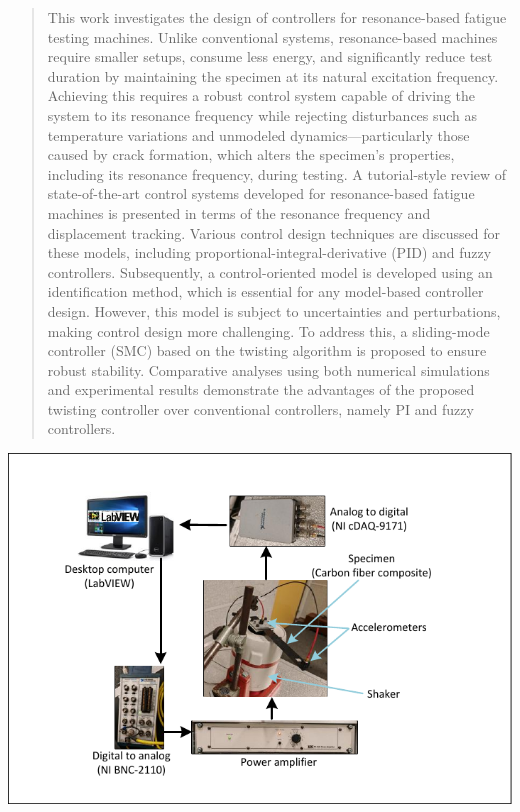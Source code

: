 \documentclass[preprint,12pt]{elsarticle}
\begin{document}
\begin{frontmatter}
\begin{abstract}
This work investigates the design of controllers for resonance-based fatigue testing machines. Unlike conventional systems, resonance-based machines require smaller setups, consume less energy, and significantly reduce test duration by maintaining the specimen at its natural excitation frequency. Achieving this requires a robust control system capable of driving the system to its resonance frequency while rejecting disturbances such as temperature variations and unmodeled dynamics—particularly those caused by crack formation, which alters the specimen’s properties, including its resonance frequency, during testing. A tutorial-style review of state-of-the-art control systems developed for resonance-based fatigue machines is presented in terms of the resonance frequency and displacement tracking. Various control design techniques are discussed for these models, including proportional-integral-derivative (PID) and fuzzy controllers. Subsequently, a control-oriented model is developed using an identification method, which is essential for any model-based controller design. However, this model is subject to uncertainties and perturbations, making control design more challenging. To address this, a sliding-mode controller (SMC) based on the twisting algorithm is proposed to ensure robust stability. Comparative analyses using both numerical simulations and experimental results demonstrate the advantages of the proposed twisting controller over conventional controllers, namely PI and fuzzy controllers.
\end{abstract}

\begin{graphicalabstract}
\includegraphics{F_experiments.pdf}
\end{graphicalabstract}


\end{frontmatter}
\end{document}
